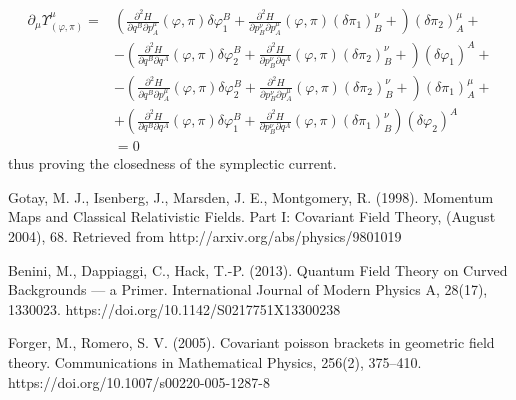\documentclass[a4paper,12pt,fleqn]{scrartcl}  %
\begin{document}
\begin{align*}
	\partial_\mu \Upsilon_{(\varphi,\pi)}^\mu  =&	 
	\left(
		\frac{\partial^2 H}{\partial q^B \partial p^\mu_A} (\varphi,\pi) \delta \varphi_1^B +
		\frac{\partial^2 H}{\partial p^\nu_B \partial p^\mu_A} (\varphi,\pi) ( \delta \pi_1)^\nu_B +
	\right) ( \delta \pi_2)^\mu_A +\\
	&-\left(
		\frac{\partial^2 H}{\partial q^B \partial q^A} (\varphi,\pi) \delta \varphi_2^B +
		\frac{\partial^2 H}{\partial p^\nu_B \partial q^A} (\varphi,\pi) ( \delta \pi_2)^\nu_B +
	\right) ( \delta \varphi_1)^A +\\
	&-\left(
		\frac{\partial^2 H}{\partial q^B \partial p^\mu_A} (\varphi,\pi) \delta \varphi_2^B +
		\frac{\partial^2 H}{\partial p^\nu_B \partial p^\mu_A} (\varphi,\pi) ( \delta \pi_2)^\nu_B +
	\right) ( \delta \pi_1)^\mu_A +\\
	&+\left(
		\frac{\partial^2 H}{\partial q^B \partial q^A} (\varphi,\pi) \delta \varphi_1^B +
		\frac{\partial^2 H}{\partial p^\nu_B \partial q^A} (\varphi,\pi) ( \delta \pi_1)^\nu_B
	\right) ( \delta \varphi_2)^A \\
	&=0
\end{align*}
thus proving the closedness of the symplectic current.








\begin{thebibliography}{9}

	Gotay, M. J., Isenberg, J., Marsden, J. E., Montgomery,	R. (1998). 
	Momentum Maps and Classical Relativistic
	Fields. Part I: Covariant Field Theory, (August 2004), 68. 
	Retrieved from http://arxiv.org/abs/physics/9801019

Benini, M., Dappiaggi, C., Hack, T.-P. (2013). Quantum Field Theory on Curved Backgrounds — a Primer. International Journal of Modern Physics A, 28(17), 1330023. https://doi.org/10.1142/S0217751X13300238

Forger, M.,  Romero, S. V. (2005). Covariant poisson brackets in geometric field theory. Communications in Mathematical Physics, 256(2), 375–410. https://doi.org/10.1007/s00220-005-1287-8

\end{thebibliography}
\end{document}
